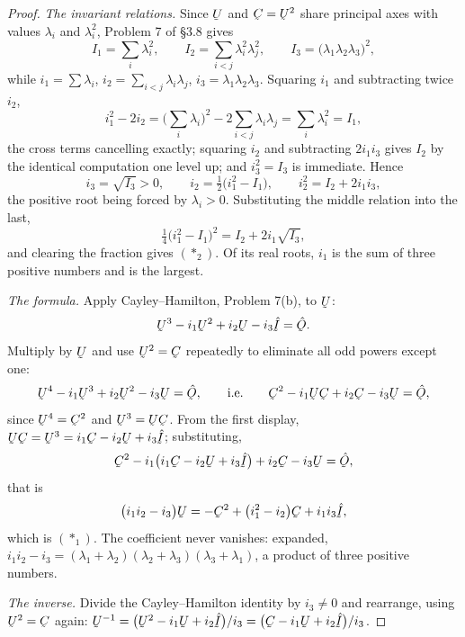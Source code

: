 \documentclass[17pt,a4paper]{extreport}
\DeclareRobustCommand{\vek}[1]{\underaccent{\tilde}{#1}}
\newcommand{\hI}{\hat{\vek{I}}}
\newcommand{\hOb}{\hat{\vek{O}}}
\newcommand{\bC}{\vek{C}}
\newcommand{\bU}{\vek{U}}
\theoremstyle{scplain}
\theoremstyle{scdefn}
\begin{document}
\begin{proof}
\emph{The invariant relations.} Since $\bU$ and $\bC=\bU^{2}$ share
principal axes with values $\lambda_{i}$ and $\lambda_{i}^{2}$, Problem 7
of \S3.8 gives
\[
   I_{1}=\sum_{i}\lambda_{i}^{2},\qquad
   I_{2}=\sum_{i<j}\lambda_{i}^{2}\lambda_{j}^{2},\qquad
   I_{3}=\big(\lambda_{1}\lambda_{2}\lambda_{3}\big)^{2},
\]
while $i_{1}=\sum\lambda_{i}$, $i_{2}=\sum_{i<j}\lambda_{i}\lambda_{j}$,
$i_{3}=\lambda_{1}\lambda_{2}\lambda_{3}$. Squaring $i_{1}$ and
subtracting twice $i_{2}$,
\[
   i_{1}^{2}-2i_{2}
   =\Big(\sum_{i}\lambda_{i}\Big)^{2}-2\sum_{i<j}\lambda_{i}\lambda_{j}
   =\sum_{i}\lambda_{i}^{2}=I_{1},
\]
the cross terms cancelling exactly; squaring $i_{2}$ and subtracting
$2i_{1}i_{3}$ gives $I_{2}$ by the identical computation one level up; and
$i_{3}^{2}=I_{3}$ is immediate. Hence
\[
   i_{3}=\sqrt{I_{3}}>0,\qquad
   i_{2}=\tfrac12\big(i_{1}^{2}-I_{1}\big),\qquad
   i_{2}^{2}=I_{2}+2i_{1}i_{3},
\]
the positive root being forced by $\lambda_{i}>0$. Substituting the middle
relation into the last,
\[
   \tfrac14\big(i_{1}^{2}-I_{1}\big)^{2}=I_{2}+2i_{1}\sqrt{I_{3}},
\]
and clearing the fraction gives $(\ast_{2})$. Of its real roots, $i_{1}$ is
the sum of three positive numbers and is the largest.

\emph{The formula.} Apply Cayley--Hamilton, Problem 7(b), to $\bU$:
\[
   \bU^{3}-i_{1}\bU^{2}+i_{2}\bU-i_{3}\hI=\hOb .
\]
Multiply by $\bU$ and use $\bU^{2}=\bC$ repeatedly to eliminate all odd
powers except one:
\[
   \bU^{4}-i_{1}\bU^{3}+i_{2}\bU^{2}-i_{3}\bU=\hOb,
   \qquad\text{i.e.}\qquad
   \bC^{2}-i_{1}\bU\bC+i_{2}\bC-i_{3}\bU=\hOb ,
\]
since $\bU^{4}=\bC^{2}$ and $\bU^{3}=\bU\bC$. From the first display,
$\bU\bC=\bU^{3}=i_{1}\bC-i_{2}\bU+i_{3}\hI$; substituting,
\[
   \bC^{2}-i_{1}\big(i_{1}\bC-i_{2}\bU+i_{3}\hI\big)+i_{2}\bC-i_{3}\bU
   =\hOb ,
\]
that is
\[
   \big(i_{1}i_{2}-i_{3}\big)\bU
   =-\bC^{2}+\big(i_{1}^{2}-i_{2}\big)\bC+i_{1}i_{3}\hI ,
\]
which is $(\ast_{1})$. The coefficient never vanishes: expanded,
$i_{1}i_{2}-i_{3}=(\lambda_{1}+\lambda_{2})(\lambda_{2}+\lambda_{3})
(\lambda_{3}+\lambda_{1})$, a product of three positive numbers.

\emph{The inverse.} Divide the Cayley--Hamilton identity by $i_{3}\neq0$
and rearrange, using $\bU^{2}=\bC$ again:
$\bU^{-1}=\big(\bU^{2}-i_{1}\bU+i_{2}\hI\big)/i_{3}
=\big(\bC-i_{1}\bU+i_{2}\hI\big)/i_{3}$.
\end{proof}
\end{document}
